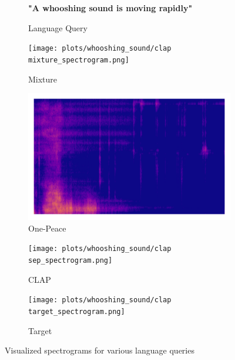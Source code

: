 \begin{figure}[!htbp]
    \begin{subfigure}[b]{0.185\textwidth}
        \centering
        \scriptsize\textbf{"A whooshing sound is moving rapidly"}
        \vspace{5.0mm}
        \caption*{Language Query}
    \end{subfigure}
    \begin{subfigure}[b]{0.185\textwidth}
        \centering
        \texttt{[image: plots/whooshing\_sound/clap mixture\_spectrogram.png]}
        \centering
        \caption*{Mixture}
    \end{subfigure}
    \begin{subfigure}[b]{0.185\textwidth}
        \centering
        \includegraphics[width=\textwidth]{plots/whooshing_sound/onepeace sep_spectrogram.png}
        \caption*{One-Peace}
    \end{subfigure}
    \begin{subfigure}[b]{0.185\textwidth}
        \centering
        \texttt{[image: plots/whooshing\_sound/clap sep\_spectrogram.png]}
        \caption*{CLAP}
    \end{subfigure}
    \begin{subfigure}[b]{0.185\textwidth}
        \centering
        \texttt{[image: plots/whooshing\_sound/clap target\_spectrogram.png]}
        \caption*{Target}
    \end{subfigure}
    
    \caption{Visualized spectrograms for various language queries}
    
    \label{fig:separation_results}

\end{figure}

